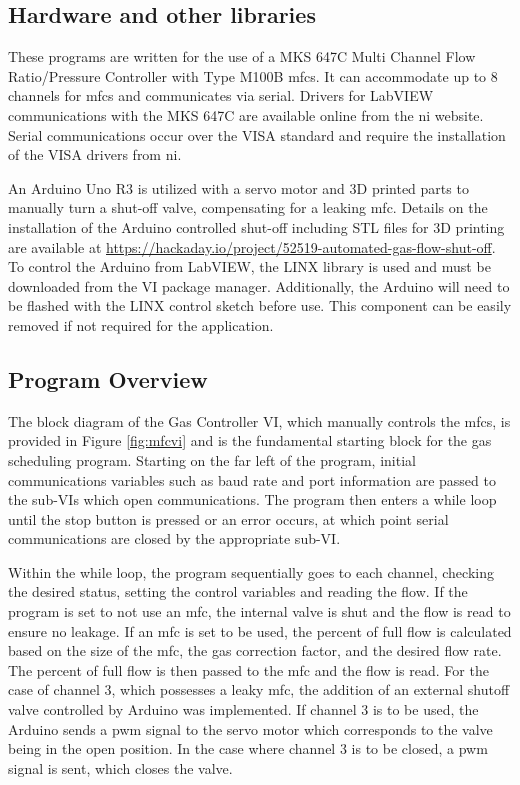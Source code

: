     \subsection{Hardware and other libraries}
        These programs are written for the use of a MKS 647C Multi Channel Flow Ratio/Pressure Controller with Type M100B \glspl{mfc}.
        It can accommodate up to 8 channels for \glspl{mfc} and communicates via serial.
        Drivers for LabVIEW communications with the MKS 647C are available online from the \gls{ni} website.
        Serial communications occur over the VISA standard and require the installation of the VISA drivers from \gls{ni}.

        An Arduino Uno R3 is utilized with a servo motor and 3D printed parts to manually turn a shut-off valve, compensating for a leaking \gls{mfc}.
        Details on the installation of the Arduino controlled shut-off including STL files for 3D printing are available at \href{https://hackaday.io/project/52519-automated-gas-flow-shut-off}{https://hackaday.io/project/52519-automated-gas-flow-shut-off}.
        To control the Arduino from LabVIEW, the LINX library is used and must be downloaded from the VI package manager.
        Additionally, the Arduino will need to be flashed with the LINX control sketch before use.
        This component can be easily removed if not required for the application.

    \subsection{Program Overview}
    The block diagram of the Gas Controller VI, which manually controls the \glspl{mfc}, is provided in Figure \ref{fig:mfcvi} and is the fundamental starting block for the gas scheduling program.
    Starting on the far left of the program, initial communications variables such as baud rate and port information are passed to the sub-VIs which open communications.
    The program then enters a while loop until the stop button is pressed or an error occurs, at which point serial communications are closed by the appropriate sub-VI.

    Within the while loop, the program sequentially goes to each channel, checking the desired status, setting the control variables and reading the flow.
    If the program is set to not use an \gls{mfc}, the internal valve is shut and the flow is read to ensure no leakage.
    If an \gls{mfc} is set to be used, the percent of full flow is calculated based on the size of the \gls{mfc}, the gas correction factor, and the desired flow rate.
    The percent of full flow is then passed to the \gls{mfc} and the flow is read.
    For the case of channel 3, which possesses a leaky \gls{mfc}, the addition of an external shutoff valve controlled by Arduino was implemented.
    If channel 3 is to be used, the Arduino sends a \gls{pwm} signal to the servo motor which corresponds to the valve being in the open position.
    In the case where channel 3 is to be closed, a \gls{pwm} signal is sent, which closes the valve.

